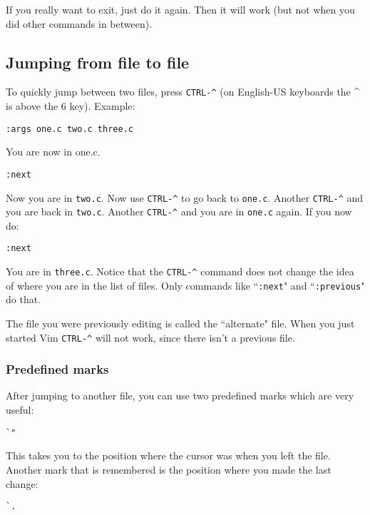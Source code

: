 If you really want to exit, just do it again.
Then it will work (but not when you did other commands in between).

\subsection{Jumping from file to file}
To quickly jump between two files, press \texttt{CTRL-\^{}}  (on English-US keyboards the \^{}  is above the 6 key).
Example:

 \begin{Verbatim}[samepage=true]
 :args one.c two.c three.c
 \end{Verbatim}

You are now in one.c.

 \begin{Verbatim}[samepage=true]
 :next
 \end{Verbatim}

Now you are in \texttt{two.c}.
Now use \texttt{CTRL-\^{}} to go back to \texttt{one.c}.
Another \texttt{CTRL-\^{}} and you are back in \texttt{two.c}.
Another \texttt{CTRL-\^{}} and you are in \texttt{one.c} again.
If you now do:

 \begin{Verbatim}[samepage=true]
 :next
 \end{Verbatim}

You are in \texttt{three.c}.
Notice that the \texttt{CTRL-\^{}} command does not change the idea of where you are in the list of files.
Only commands like ``\texttt{:next}" and ``\texttt{:previous}" do that.

The file you were previously editing is called the ``alternate" file.
When you just started Vim \texttt{CTRL-\^{}} will not work, since there isn't a previous file.

\subsubsection{Predefined marks}
After jumping to another file, you can use two predefined marks which are very useful:

 \begin{Verbatim}[samepage=true]
 `"
 \end{Verbatim}

This takes you to the position where the cursor was when you left the file.
Another mark that is remembered is the position where you made the last change:

 \begin{Verbatim}[samepage=true]
 `.
 \end{Verbatim}

